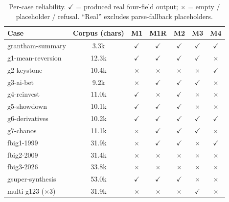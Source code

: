 \documentclass[11pt]{article}
\begin{document}
\begin{table}[h]
\centering
\small
\caption{Per-case reliability. $\checkmark$ = produced real four-field output;
$\times$ = empty / placeholder / refusal. ``Real'' excludes parse-fallback
placeholders.}
\label{tab:percase}
\begin{tabular}{@{}lcccccc@{}}
\toprule
\textbf{Case} & \textbf{Corpus (chars)} & \textbf{M1} & \textbf{M1R} & \textbf{M2} & \textbf{M3} & \textbf{M4} \\
\midrule
grantham-summary     & 3.3k  & $\checkmark$ & $\checkmark$ & $\checkmark$ & $\checkmark$ & $\checkmark$ \\
g1-mean-reversion    & 12.3k & $\checkmark$ & $\checkmark$ & $\checkmark$ & $\checkmark$ & $\times$      \\
g2-keystone          & 10.4k & $\times$     & $\times$     & $\times$     & $\times$     & $\checkmark$ \\
g3-ai-bet            & 9.2k  & $\times$     & $\checkmark$ & $\checkmark$ & $\checkmark$ & $\times$      \\
g4-reinvest          & 11.0k & $\checkmark$ & $\times$     & $\checkmark$ & $\times$     & $\times$      \\
g5-showdown          & 10.1k & $\checkmark$ & $\checkmark$ & $\checkmark$ & $\times$     & $\times$      \\
g6-derivatives       & 10.2k & $\checkmark$ & $\checkmark$ & $\checkmark$ & $\checkmark$ & $\checkmark$ \\
g7-chanos            & 11.1k & $\times$     & $\checkmark$ & $\checkmark$ & $\checkmark$ & $\times$      \\
fbig1-1999           & 31.9k & $\times$     & $\checkmark$ & $\checkmark$ & $\times$     & $\checkmark$ \\
fbig2-2009           & 31.4k & $\times$     & $\times$     & $\times$     & $\times$     & $\times$      \\
fbig3-2026           & 33.8k & $\times$     & $\times$     & $\times$     & $\times$     & $\times$      \\
gsuper-synthesis     & 53.0k & $\checkmark$ & $\checkmark$ & $\checkmark$ & $\times$     & $\times$      \\
multi-g123 ($\times$3) & 31.9k & $\times$   & $\times$     & $\times$     & $\checkmark$ & $\times$      \\
\bottomrule
\end{tabular}
\end{table}

\end{document}

